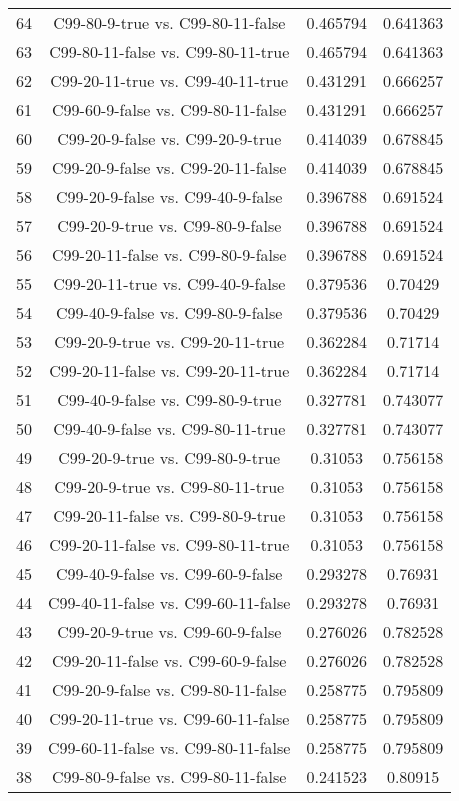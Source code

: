 \documentclass[a4paper,10pt]{article}
\begin{document}
\begin{landscape}
\begin{table}[!htp]
\begin{tabular}{cccc}
64&C99-80-9-true vs. C99-80-11-false&0.465794&0.641363\\
63&C99-80-11-false vs. C99-80-11-true&0.465794&0.641363\\
62&C99-20-11-true vs. C99-40-11-true&0.431291&0.666257\\
61&C99-60-9-false vs. C99-80-11-false&0.431291&0.666257\\
60&C99-20-9-false vs. C99-20-9-true&0.414039&0.678845\\
59&C99-20-9-false vs. C99-20-11-false&0.414039&0.678845\\
58&C99-20-9-false vs. C99-40-9-false&0.396788&0.691524\\
57&C99-20-9-true vs. C99-80-9-false&0.396788&0.691524\\
56&C99-20-11-false vs. C99-80-9-false&0.396788&0.691524\\
55&C99-20-11-true vs. C99-40-9-false&0.379536&0.70429\\
54&C99-40-9-false vs. C99-80-9-false&0.379536&0.70429\\
53&C99-20-9-true vs. C99-20-11-true&0.362284&0.71714\\
52&C99-20-11-false vs. C99-20-11-true&0.362284&0.71714\\
51&C99-40-9-false vs. C99-80-9-true&0.327781&0.743077\\
50&C99-40-9-false vs. C99-80-11-true&0.327781&0.743077\\
49&C99-20-9-true vs. C99-80-9-true&0.31053&0.756158\\
48&C99-20-9-true vs. C99-80-11-true&0.31053&0.756158\\
47&C99-20-11-false vs. C99-80-9-true&0.31053&0.756158\\
46&C99-20-11-false vs. C99-80-11-true&0.31053&0.756158\\
45&C99-40-9-false vs. C99-60-9-false&0.293278&0.76931\\
44&C99-40-11-false vs. C99-60-11-false&0.293278&0.76931\\
43&C99-20-9-true vs. C99-60-9-false&0.276026&0.782528\\
42&C99-20-11-false vs. C99-60-9-false&0.276026&0.782528\\
41&C99-20-9-false vs. C99-80-11-false&0.258775&0.795809\\
40&C99-20-11-true vs. C99-60-11-false&0.258775&0.795809\\
39&C99-60-11-false vs. C99-80-11-false&0.258775&0.795809\\
38&C99-80-9-false vs. C99-80-11-false&0.241523&0.80915\\

\end{tabular}
\end{table}
\end{landscape}
\end{document}
